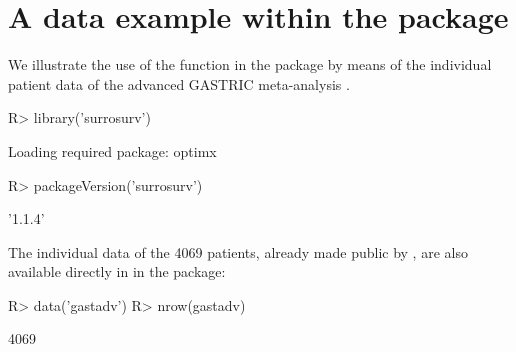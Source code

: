 \documentclass[article,shortnames, nojss]{jss}\usepackage[]{graphicx}\usepackage[]{color}
\begin{document}
\section[A data example within the surrosurv package]{A data example within the  package}
We illustrate the use of the function in the  package
by means of the individual patient data of the advanced GASTRIC meta-analysis
\citep{GASTRIC13, Paoletti2013}.
\begin{Schunk}
\begin{Sinput}
R> library('surrosurv')
\end{Sinput}
\begin{Soutput}
Loading required package: optimx
\end{Soutput}
\begin{Sinput}
R> packageVersion('surrosurv')
\end{Sinput}
\begin{Soutput}
[1] '1.1.4'
\end{Soutput}
\end{Schunk}

The individual data of the 4069 patients,
already made public by \cite{BuyseEtal15},
are also available directly in  in the  package:
\begin{Schunk}
\begin{Sinput}
R> data('gastadv')
R> nrow(gastadv)
\end{Sinput}
\begin{Soutput}
[1] 4069
\end{Soutput}
\end{Schunk}
\end{document}
